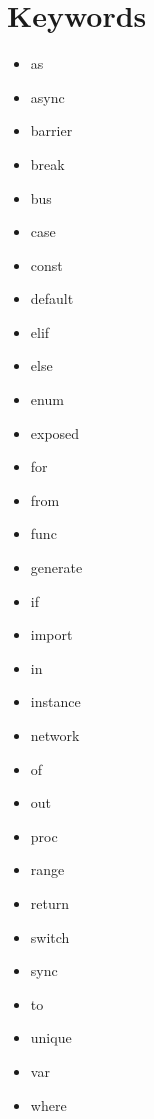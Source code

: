 \documentclass{article}
\begin{document}
\section*{Keywords}
\begin{multicols}{3}
  \begin{itemize}
  \item as
  \item async
  \item barrier
  \item break
  \item bus
  \item case
  \item const
  \item default
  \item elif
  \item else
  \item enum
  \item exposed
  \item for
  \item from
  \item func
  \item generate
  \item if
  \item import
  \item in
  \item instance
  \item network
  \item of
  \item out
  \item proc
  \item range
  \item return
  \item switch
  \item sync
  \item to
  \item unique
  \item var
  \item where
  \end{itemize}
\end{multicols}
\end{document}
